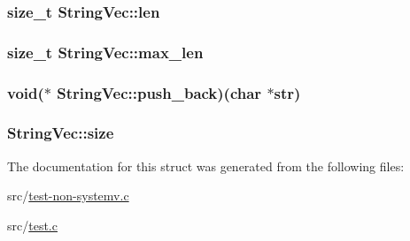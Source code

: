 \subsubsection[{\texorpdfstring{len}{len}}]{\setlength{\rightskip}{0pt plus 5cm}size\+\_\+t String\+Vec\+::len}\hypertarget{struct_string_vec_a1dc740add1d3783ed79b118f3b115e7e}{}\label{struct_string_vec_a1dc740add1d3783ed79b118f3b115e7e}
\subsubsection[{\texorpdfstring{max\+\_\+len}{max_len}}]{\setlength{\rightskip}{0pt plus 5cm}size\+\_\+t String\+Vec\+::max\+\_\+len}\hypertarget{struct_string_vec_acd88f36d6487fb52ec7fac1e2a3699fc}{}\label{struct_string_vec_acd88f36d6487fb52ec7fac1e2a3699fc}
\subsubsection[{\texorpdfstring{push\+\_\+back}{push_back}}]{\setlength{\rightskip}{0pt plus 5cm}void($\ast$ String\+Vec\+::push\+\_\+back)(char $\ast$str)}\hypertarget{struct_string_vec_af05c9a2ae87afdb54531240ca7ff125d}{}\label{struct_string_vec_af05c9a2ae87afdb54531240ca7ff125d}
\subsubsection[{\texorpdfstring{size}{size}}]{ String\+Vec\+::size}\hypertarget{struct_string_vec_ae4ae32f5a45935a1d362357d264b6c2c}{}\label{struct_string_vec_ae4ae32f5a45935a1d362357d264b6c2c}


The documentation for this struct was generated from the following files\+:\begin{DoxyCompactItemize}
\item 
src/\hyperlink{test-non-systemv_8c}{test-\/non-\/systemv.\+c}\item 
src/\hyperlink{test_8c}{test.\+c}\end{DoxyCompactItemize}
